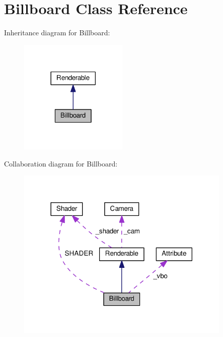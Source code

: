 \hypertarget{class_billboard}{}\section{Billboard Class Reference}
\label{class_billboard}


Inheritance diagram for Billboard\+:\nopagebreak
\begin{figure}[H]
\begin{center}
\leavevmode
\includegraphics[width=146pt]{class_billboard__inherit__graph}
\end{center}
\end{figure}


Collaboration diagram for Billboard\+:\nopagebreak
\begin{figure}[H]
\begin{center}
\leavevmode
\includegraphics[width=290pt]{class_billboard__coll__graph}
\end{center}
\end{figure}
